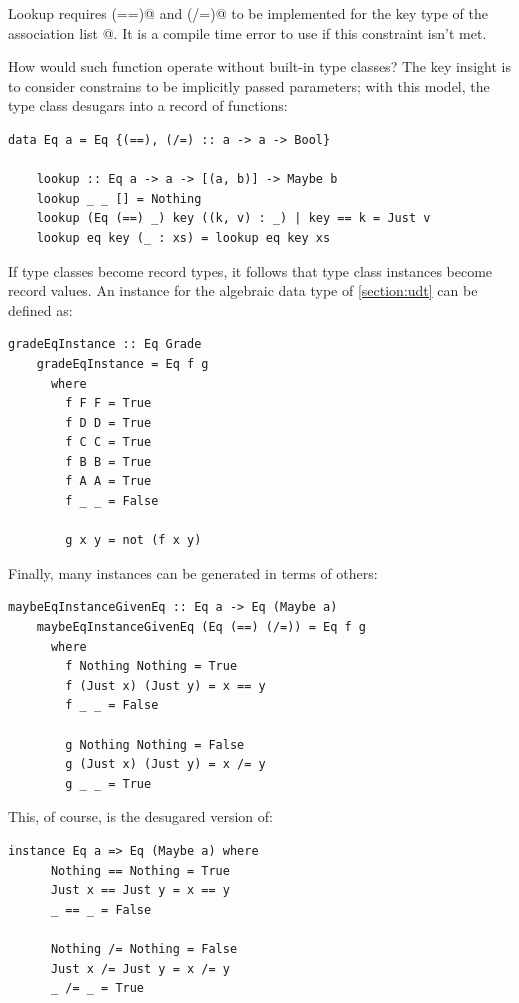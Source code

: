 \documentclass[UdineBachThesis,american,11pt]{PhdThesis}
\begin{document}
  Lookup requires \lstinline@(==)@ and \lstinline@(/=)@ to be implemented for
  the key type \lstinline@a@ of the association list \lstinline@[(a, b)]@. It is
  a compile time error to use \lstinline@lookup@ if this constraint isn't met.

  How would such function operate without built-in type classes? The key insight
  is to consider constrains to be implicitly passed parameters; with this model,
  the \lstinline@Eq@ type class desugars into a record of functions:

  \begin{lstlisting}[gobble=4,basicstyle=\ttfamily\small]
    data Eq a = Eq {(==), (/=) :: a -> a -> Bool}

    lookup :: Eq a -> a -> [(a, b)] -> Maybe b
    lookup _ _ [] = Nothing
    lookup (Eq (==) _) key ((k, v) : _) | key == k = Just v
    lookup eq key (_ : xs) = lookup eq key xs
  \end{lstlisting}

  If type classes become record types, it follows that type class instances
  become record values. An \lstinline@Eq@ instance for the algebraic data type
  \lstinline@Grade@ of \autoref{section:udt} can be defined as:

  \begin{lstlisting}[gobble=4,basicstyle=\ttfamily\small]
    gradeEqInstance :: Eq Grade
    gradeEqInstance = Eq f g
      where
        f F F = True
        f D D = True
        f C C = True
        f B B = True
        f A A = True
        f _ _ = False

        g x y = not (f x y)
  \end{lstlisting}

  \pagebreak

  Finally, many instances can be generated in terms of others:

  \begin{lstlisting}[gobble=4,basicstyle=\ttfamily\small]
    maybeEqInstanceGivenEq :: Eq a -> Eq (Maybe a)
    maybeEqInstanceGivenEq (Eq (==) (/=)) = Eq f g
      where
        f Nothing Nothing = True
        f (Just x) (Just y) = x == y
        f _ _ = False

        g Nothing Nothing = False
        g (Just x) (Just y) = x /= y
        g _ _ = True
  \end{lstlisting}

  This, of course, is the desugared version of:

  \begin{lstlisting}[gobble=4,basicstyle=\ttfamily\small]
    instance Eq a => Eq (Maybe a) where
      Nothing == Nothing = True
      Just x == Just y = x == y
      _ == _ = False

      Nothing /= Nothing = False
      Just x /= Just y = x /= y
      _ /= _ = True
  \end{lstlisting}
\end{document}
